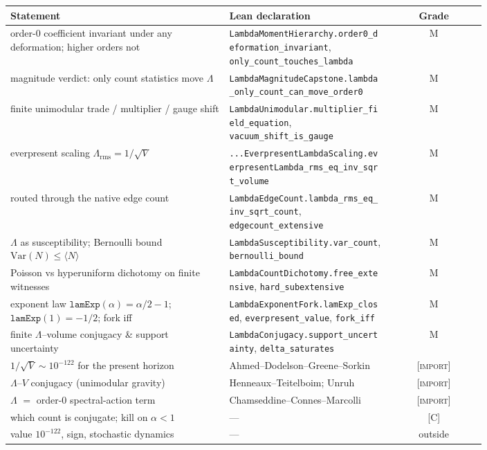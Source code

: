 \documentclass[11pt]{article}
\newcommand{\Lam}{\Lambda}
\newcommand{\Kernel}{\textcolor{kcol}{\textsc{M}}}       %
\newcommand{\Import}{\textcolor{icol}{\textsc{[import]}}} %
\newcommand{\Conj}{\textcolor{ccol}{\textsc{[C]}}}        %
\newcommand{\lm}[1]{\texttt{#1}}
\begin{document}
\begin{center}\small
\begin{tabular}{@{}p{0.46\linewidth}p{0.34\linewidth}c@{}}
\toprule
Statement & Lean declaration & Grade\\
\midrule
order-0 coefficient invariant under any deformation; higher orders not &
\lm{LambdaMomentHierarchy.order0\_deformation\_invariant}, \lm{only\_count\_touches\_lambda} & \Kernel\\
magnitude verdict: only count statistics move $\Lam$ &
\lm{LambdaMagnitudeCapstone.lambda\_only\_count\_can\_move\_order0} & \Kernel\\
finite unimodular trade / multiplier / gauge shift &
\lm{LambdaUnimodular.multiplier\_field\_equation}, \lm{vacuum\_shift\_is\_gauge} & \Kernel\\
everpresent scaling $\Lam_{\mathrm{rms}}=1/\sqrt V$ &
\lm{...EverpresentLambdaScaling.everpresentLambda\_rms\_eq\_inv\_sqrt\_volume} & \Kernel\\
routed through the native edge count &
\lm{LambdaEdgeCount.lambda\_rms\_eq\_inv\_sqrt\_count}, \lm{edgecount\_extensive} & \Kernel\\
$\Lam$ as susceptibility; Bernoulli bound $\mathrm{Var}(N)\le\langle N\rangle$ &
\lm{LambdaSusceptibility.var\_count}, \lm{bernoulli\_bound} & \Kernel\\
Poisson vs hyperuniform dichotomy on finite witnesses &
\lm{LambdaCountDichotomy.free\_extensive}, \lm{hard\_subextensive} & \Kernel\\
exponent law $\lm{lamExp}(\alpha)=\alpha/2-1$; $\lm{lamExp}(1)=-1/2$; fork iff &
\lm{LambdaExponentFork.lamExp\_closed}, \lm{everpresent\_value}, \lm{fork\_iff} & \Kernel\\
finite $\Lam$--volume conjugacy \& support uncertainty &
\lm{LambdaConjugacy.support\_uncertainty}, \lm{delta\_saturates} & \Kernel\\
$1/\sqrt V\sim10^{-122}$ for the present horizon & Ahmed--Dodelson--Greene--Sorkin & \Import\\
$\Lam$--$V$ conjugacy (unimodular gravity) & Henneaux--Teitelboim; Unruh & \Import\\
$\Lam$ $=$ order-0 spectral-action term & Chamseddine--Connes--Marcolli & \Import\\
which count is conjugate; kill on $\alpha<1$ & — & \Conj\\
value $10^{-122}$, sign, stochastic dynamics & — & outside\\
\bottomrule
\end{tabular}
\end{center}
\end{document}
